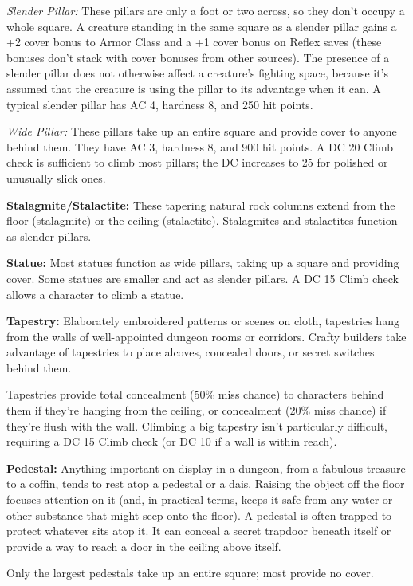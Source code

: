 \textit{Slender Pillar:} These pillars are only a foot or two across, so they don't occupy a whole square. A creature standing in the same square as a slender pillar gains a +2 cover bonus to Armor Class and a +1 cover bonus on Reflex saves (these bonuses don't stack with cover bonuses from other sources). The presence of a slender pillar does not otherwise affect a creature's fighting space, because it's assumed that the creature is using the pillar to its advantage when it can. A typical slender pillar has AC 4, hardness 8, and 250 hit points.

\textit{Wide Pillar:} These pillars take up an entire square and provide cover to anyone behind them. They have AC 3, hardness 8, and 900 hit points. A DC 20 Climb check is sufficient to climb most pillars; the DC increases to 25 for polished or unusually slick ones. 

\textbf{Stalagmite/Stalactite:} These tapering natural rock columns extend from the floor (stalagmite) or the ceiling (stalactite). Stalagmites and stalactites function as slender pillars.

\textbf{Statue:} Most statues function as wide pillars, taking up a square and providing cover. Some statues are smaller and act as slender pillars. A DC 15 Climb check allows a character to climb a statue. 

\textbf{Tapestry:} Elaborately embroidered patterns or scenes on cloth, tapestries hang from the walls of well-appointed dungeon rooms or corridors. Crafty builders take advantage of tapestries to place alcoves, concealed doors, or secret switches behind them.

Tapestries provide total concealment (50\% miss chance) to characters behind them if they're hanging from the ceiling, or concealment (20\% miss chance) if they're flush with the wall. Climbing a big tapestry isn't particularly difficult, requiring a DC 15 Climb check (or DC 10 if a wall is within reach).

\textbf{Pedestal:} Anything important on display in a dungeon, from a fabulous treasure to a coffin, tends to rest atop a pedestal or a dais. Raising the object off the floor focuses attention on it (and, in practical terms, keeps it safe from any water or other substance that might seep onto the floor). A pedestal is often trapped to protect whatever sits atop it. It can conceal a secret trapdoor beneath itself or provide a way to reach a door in the ceiling above itself.

Only the largest pedestals take up an entire square; most provide no cover.

